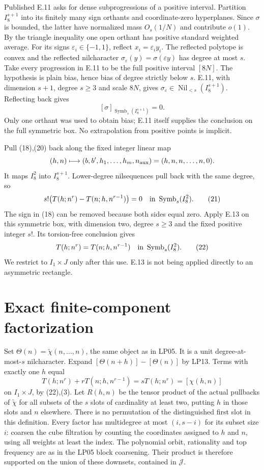 \documentclass[11pt]{article}
\newcommand{\Symb}{\operatorname{Symb}}
\newcommand{\Nil}{\operatorname{Nil}}
\begin{document}
Published E.11 asks for dense subprogressions of a positive interval.
Partition $I_8^{s+1}$ into its finitely many sign orthants and coordinate-zero
hyperplanes. Since $\sigma$ is bounded, the latter have normalized mass
$O_s(1/N)$ and contribute $o(1)$. By the triangle inequality one open
orthant has positive standard weighted average. For its signs
$\varepsilon_i\in\{-1,1\}$, reflect $x_i=\varepsilon_i y_i$.
The reflected polytope is convex and the reflected nilcharacter
$\sigma_\varepsilon(y)=\sigma(\varepsilon y)$ has degree at most $s$.
Take every progression in E.11 to be the full positive interval $[8N]$.
The hypothesis is plain bias, hence bias of degree strictly below $s$.
E.11, with dimension $s+1$, degree $s\geq3$ and scale $8N$, gives
$\sigma_\varepsilon\in\Nil_{<s}(I_8^{s+1})$. Reflecting back gives
\[
 [\sigma]_{\Symb_s(I_8^{s+1})}=0.                        \tag{20}
\]
Only one orthant was used to obtain bias; E.11 itself supplies the conclusion
on the full symmetric box. No extrapolation from positive points is implicit.

Pull (18),(20) back along the fixed integer linear map
\[
 (h,n)\longmapsto(b,b',h_1,\ldots,h_m,n_{\rm aux})
                 =(h,n,n,\ldots,n,0).
\]
It maps $I_8^2$ into $I_8^{s+1}$. Lower-degree nilsequences pull back with
the same degree, so
\[
 s!\bigl(T(h;n^r)-T(n;h,n^{r-1})\bigr)=0
                    \quad\hbox{in }\Symb_s(I_8^2).       \tag{21}
\]
The sign in (18) can be removed because both sides equal zero. Apply E.13
on this symmetric box, with dimension two, degree $s\geq3$ and the fixed
positive integer $s!$. Its torsion-free conclusion gives
\[
 T(h;n^r)=T(n;h,n^{r-1})\quad\hbox{in }\Symb_s(I_8^2).  \tag{22}
\]
We restrict to $I_1\times J$ only after this use. E.13 is not being applied
directly to an asymmetric rectangle.

\section{Exact finite-component factorization}
Set $\Theta(n)=\widetilde\chi(n,\ldots,n)$, the same object as in LP05.
It is a unit degree-at-most-$s$ nilcharacter. Expand
$[\Theta(n+h)]-[\Theta(n)]$ by LP13. Terms with exactly one $h$ equal
\[
 T(h;n^r)+rT(n;h,n^{r-1})=sT(h;n^r)=[\chi(h,n)]          \tag{23}
\]
on $I_1\times J$, by (22),(3). Let $R(h,n)$ be the tensor product of
the actual pullbacks of $\widetilde\chi$ for all subsets of the $s$ slots
of cardinality at least two, putting $h$ in those slots and $n$ elsewhere.
There is no permutation of the distinguished first slot in this definition.
Every factor has multidegree at most $(i,s-i)$ for its subset size $i$:
coarsen the cube filtration by counting the coordinates assigned to $h$
and $n$, using all weights at least the index. The polynomial orbit,
rationality and top frequency are as in the LP05 block coarsening.
Their product is therefore supported on the union of these downsets,
contained in $\mathcal J$.
\end{document}
